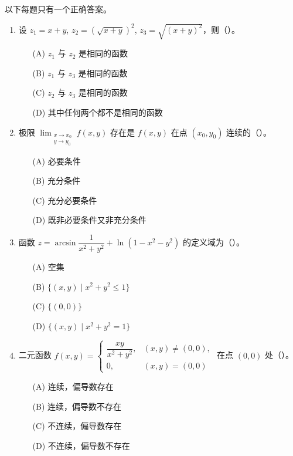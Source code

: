 \documentclass[lang=cn,11pt]{elegantbook}
\begin{document}

\begin{exercise}
以下每题只有一个正确答案。
\begin{enumerate}
  \item 设 $z_1=x+y$, $z_2=(\sqrt{x+y})^2$, $z_3=\sqrt{(x+y)^2}$，则（\qquad）。
    \begin{enumerate}
      \item[(A)] $z_1$ 与 $z_2$ 是相同的函数
      \item[(B)] $z_1$ 与 $z_3$ 是相同的函数
      \item[(C)] $z_2$ 与 $z_3$ 是相同的函数
      \item[(D)] 其中任何两个都不是相同的函数
    \end{enumerate}

  \item 极限 $\displaystyle\lim_{\substack{x\to x_0 \\ y\to y_0}}f(x,y)$ 存在是 $f(x,y)$ 在点 $(x_0,y_0)$ 连续的（\qquad）。
    \begin{enumerate}
      \item[(A)] 必要条件
      \item[(B)] 充分条件
      \item[(C)] 充分必要条件
      \item[(D)] 既非必要条件又非充分条件
    \end{enumerate}

  \item 函数 $z=\arcsin\dfrac{1}{x^2+y^2}+\ln(1-x^2-y^2)$ 的定义域为（\qquad）。
    \begin{enumerate}
      \item[(A)] 空集
      \item[(B)] $\{(x,y)\mid x^2+y^2\leq 1\}$
      \item[(C)] $\{(0,0)\}$
      \item[(D)] $\{(x,y)\mid x^2+y^2=1\}$
    \end{enumerate}

  \item 二元函数 $f(x,y)=\begin{cases}\dfrac{xy}{x^2+y^2}, & (x,y) \neq (0,0),\\[4pt] 0, & (x,y)=(0,0)\end{cases}$
        在点 $(0,0)$ 处（\qquad）。
    \begin{enumerate}
      \item[(A)] 连续，偏导数存在
      \item[(B)] 连续，偏导数不存在
      \item[(C)] 不连续，偏导数存在
      \item[(D)] 不连续，偏导数不存在
    \end{enumerate}


\end{enumerate}
\end{exercise}
\end{document}
